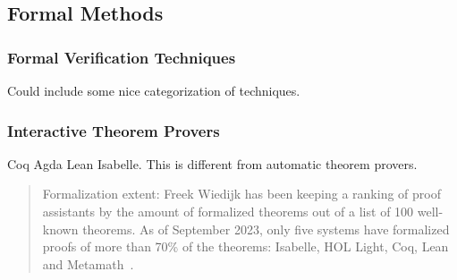 \subsection{Formal Methods}
\label{subsec:fml}

\subsubsection{Formal Verification Techniques}


Could include some nice categorization of techniques.

\subsubsection{Interactive Theorem Provers}

Coq Agda Lean Isabelle.
This is different from automatic theorem provers.

\begin{quote}
Formalization extent:
Freek Wiedijk has been keeping a ranking of proof
assistants by the amount of formalized theorems out of a list of 100 well-known theorems.
As of September 2023, only five systems have formalized proofs of more
than 70\% of the theorems: Isabelle, HOL Light, Coq, Lean and
Metamath~\cite{proofassistants}.
\end{quote}

